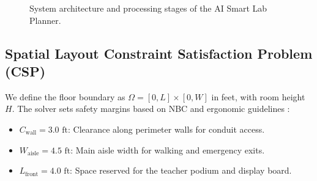 \documentclass[conference]{IEEEtran}
\begin{document}
\begin{figure}[htbp]
\centering
{}
\caption{System architecture and processing stages of the AI Smart Lab Planner.}
\label{fig:system_arch}
\end{figure}

\subsection{Spatial Layout Constraint Satisfaction Problem (CSP)}
We define the floor boundary as $\Omega = [0, L] \times [0, W]$ in feet, with room height $H$. The solver sets safety margins based on NBC and ergonomic guidelines \cite{ref_ergonomics, ref_osha}:
\begin{itemize}
    \item $C_{\text{wall}} = 3.0\text{ ft}$: Clearance along perimeter walls for conduit access.
    \item $W_{\text{aisle}} = 4.5\text{ ft}$: Main aisle width for walking and emergency exits.
    \item $L_{\text{front}} = 4.0\text{ ft}$: Space reserved for the teacher podium and display board.
\end{itemize}
\end{document}
